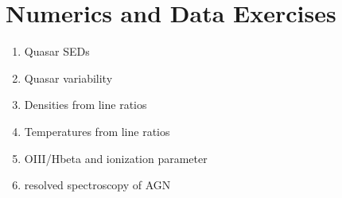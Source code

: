\section{Numerics and Data Exercises}

\begin{enumerate}
\item Quasar SEDs
\item Quasar variability
\item Densities from line ratios
\item Temperatures from line ratios
\item OIII/Hbeta and ionization parameter
\item resolved spectroscopy of AGN
\end{enumerate}


  

